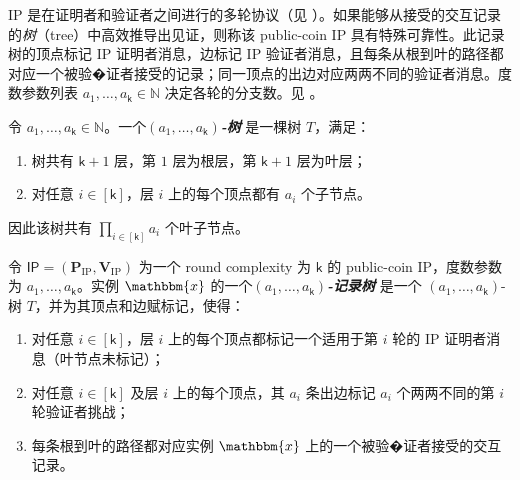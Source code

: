 \documentclass[american,singlepageview]{snargs-book-zh}
\newcommand{\defemph}[1]{\textbf{\emph{#1}}}
\newcommand{\Naturals}{\mathbb{N}}
\newcommand{\Instance}{\mathbbm{x}}
\newcommand{\ProtoProver}{P}
\newcommand{\ProtoVerifier}{V}
\newcommand{\ProtoRoundComplexity}{\mathsf{k}}
\newcommand{\RoundIndex}{i}
\newcommand{\IPSymbol}{\mathsf{IP}}
\newcommand{\IPSystem}{(\IPProver,\IPVerifier)}
\newcommand{\IPSubscript}{\scriptscriptstyle\mathrm{IP}}
\newcommand{\IPFormat}[1]{\mathbf{#1}}
\newcommand{\IPProver}{\IPFormat{\ProtoProver}_{\IPSubscript}}
\newcommand{\IPVerifier}{\IPFormat{\ProtoVerifier}_{\IPSubscript}}
\newcommand{\IPRoundComplexity}{\ProtoRoundComplexity}
\newcommand{\SSArity}{a}
\newcommand{\SSTree}{T}
\begin{document}
IP 是在证明者和验证者之间进行的多轮协议（见 ）。如果能够从接受的交互记录的\emph{树}（tree）中高效推导出见证，则称该 public-coin IP 具有特殊可靠性。此记录树的顶点标记 IP 证明者消息，边标记 IP 验证者消息，且每条从根到叶的路径都对应一个被验�证者接受的记录；同一顶点的出边对应两两不同的验证者消息。度数参数列表 $\SSArity_{1},\dots,\SSArity_{\IPRoundComplexity}\in\Naturals$ 决定各轮的分支数。见 。

\begin{definition}
\label{definition:ss-tree-structure}
令 $\SSArity_{1},\dots,\SSArity_{\IPRoundComplexity}\in\Naturals$。一个\defemph{$(\SSArity_{1},\dots,\SSArity_{\IPRoundComplexity})$-树} 是一棵树 $\SSTree$，满足：
\begin{enumerate}[nolistsep]
  \item 树共有 $\IPRoundComplexity+1$ 层，第 $1$ 层为根层，第 $\IPRoundComplexity+1$ 层为叶层；
  \item 对任意 $\RoundIndex\in[\IPRoundComplexity]$，层 $\RoundIndex$ 上的每个顶点都有 $\SSArity_{\RoundIndex}$ 个子节点。
\end{enumerate}
因此该树共有 $\prod_{\RoundIndex\in[\IPRoundComplexity]}\SSArity_{\RoundIndex}$ 个叶子节点。
\end{definition}

\begin{definition}
\label{definition:ss-tree-of-transcripts}
令 $\IPSymbol=\IPSystem$ 为一个 round complexity 为 $\IPRoundComplexity$ 的 public-coin IP，度数参数为 $\SSArity_{1},\dots,\SSArity_{\IPRoundComplexity}$。实例 $\Instance$ 的一个\defemph{$(\SSArity_{1},\dots,\SSArity_{\IPRoundComplexity})$-记录树} 是一个 $(\SSArity_{1},\dots,\SSArity_{\IPRoundComplexity})$-树 $\SSTree$，并为其顶点和边赋标记，使得：
\begin{enumerate}[nolistsep]
  \item 对任意 $\RoundIndex\in[\IPRoundComplexity]$，层 $\RoundIndex$ 上的每个顶点都标记一个适用于第 $\RoundIndex$ 轮的 IP 证明者消息（叶节点未标记）；
  \item 对任意 $\RoundIndex\in[\IPRoundComplexity]$ 及层 $\RoundIndex$ 上的每个顶点，其 $\SSArity_{\RoundIndex}$ 条出边标记 $\SSArity_{\RoundIndex}$ 个两两不同的第 $\RoundIndex$ 轮验证者挑战；
  \item 每条根到叶的路径都对应实例 $\Instance$ 上的一个被验�证者接受的交互记录。
\end{enumerate}
\end{definition}
\end{document}
